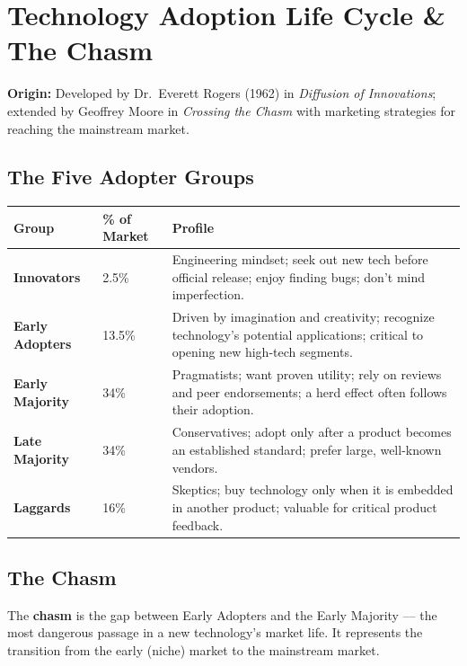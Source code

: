 \documentclass[11pt, letterpaper]{article}
\begin{document}
\section{Technology Adoption Life Cycle \& The Chasm}

\begin{defbox}
\textbf{Origin:} Developed by Dr.\ Everett Rogers (1962) in \textit{Diffusion of Innovations}; extended by Geoffrey Moore in \textit{Crossing the Chasm} with marketing strategies for reaching the mainstream market.
\end{defbox}

\subsection{The Five Adopter Groups}

\begin{center}
\begin{tabular}{>{\bfseries}p{3cm} p{1.8cm} p{7.5cm}}
\toprule
Group & \% of Market & Profile \\
\midrule
Innovators & 2.5\% & Engineering mindset; seek out new tech before official release; enjoy finding bugs; don't mind imperfection. \\
\addlinespace
Early Adopters & 13.5\% & Driven by imagination and creativity; recognize technology's potential applications; critical to opening new high-tech segments. \\
\addlinespace
Early Majority & 34\% & Pragmatists; want proven utility; rely on reviews and peer endorsements; a herd effect often follows their adoption. \\
\addlinespace
Late Majority & 34\% & Conservatives; adopt only after a product becomes an established standard; prefer large, well-known vendors. \\
\addlinespace
Laggards & 16\% & Skeptics; buy technology only when it is embedded in another product; valuable for critical product feedback. \\
\bottomrule
\end{tabular}
\end{center}

\subsection{The Chasm}

The \textbf{chasm} is the gap between Early Adopters and the Early Majority --- the most dangerous passage in a new technology's market life. It represents the transition from the early (niche) market to the mainstream market.
\end{document}
